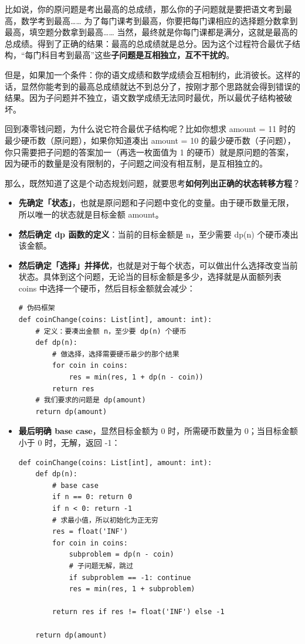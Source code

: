 \documentclass[12pt]{article}
\begin{document}
比如说，你的原问题是考出最高的总成绩，那么你的子问题就是要把语文考到最高，数学考到最高…… 为了每门课考到最高，你要把每门课相应的选择题分数拿到最高，填空题分数拿到最高…… 当然，最终就是你每门课都是满分，这就是最高的总成绩。得到了正确的结果：最高的总成绩就是总分。因为这个过程符合最优子结构，“每门科目考到最高”这些\textbf{子问题是互相独立，互不干扰的}。

但是，如果加一个条件：你的语文成绩和数学成绩会互相制约，此消彼长。这样的话，显然你能考到的最高总成绩就达不到总分了，按刚才那个思路就会得到错误的结果。因为子问题并不独立，语文数学成绩无法同时最优，所以最优子结构被破坏。

回到凑零钱问题，为什么说它符合最优子结构呢？比如你想求 amount = 11 时的最少硬币数（原问题），如果你知道凑出 amount = 10 的最少硬币数（子问题），你只需要把子问题的答案加一（再选一枚面值为 1 的硬币）就是原问题的答案，因为硬币的数量是没有限制的，子问题之间没有相互制，是互相独立的。

那么，既然知道了这是个动态规划问题，就要思考\textbf{如何列出正确的状态转移方程}？

\begin{itemize}
\setlength{\itemsep}{0pt}
\setlength{\parsep}{0pt}
\setlength{\parskip}{0pt}
    \item \textbf{先确定「状态」}，也就是原问题和子问题中变化的变量。由于硬币数量无限，所以唯一的状态就是目标金额 amount。
    \item \textbf{然后确定 dp 函数的定义}：当前的目标金额是 n，至少需要 dp(n) 个硬币凑出该金额。
    \item \textbf{然后确定「选择」并择优}，也就是对于每个状态，可以做出什么选择改变当前状态。具体到这个问题，无论当的目标金额是多少，选择就是从面额列表 coins 中选择一个硬币，然后目标金额就会减少：
    \begin{lstlisting}
# 伪码框架
def coinChange(coins: List[int], amount: int):
    # 定义：要凑出金额 n，至少要 dp(n) 个硬币
    def dp(n):
        # 做选择，选择需要硬币最少的那个结果
        for coin in coins:
            res = min(res, 1 + dp(n - coin))
        return res
    # 我们要求的问题是 dp(amount)
    return dp(amount)
\end{lstlisting}
   \item \textbf{最后明确 base case}，显然目标金额为 0 时，所需硬币数量为 0；当目标金额小于 0 时，无解，返回 -1：
       \begin{lstlisting}
def coinChange(coins: List[int], amount: int):
    def dp(n):
        # base case
        if n == 0: return 0
        if n < 0: return -1
        # 求最小值，所以初始化为正无穷
        res = float('INF')
        for coin in coins:
            subproblem = dp(n - coin)
            # 子问题无解，跳过
            if subproblem == -1: continue
            res = min(res, 1 + subproblem)

        return res if res != float('INF') else -1
    
    return dp(amount)
\end{lstlisting}
\end{itemize}
\end{document}
